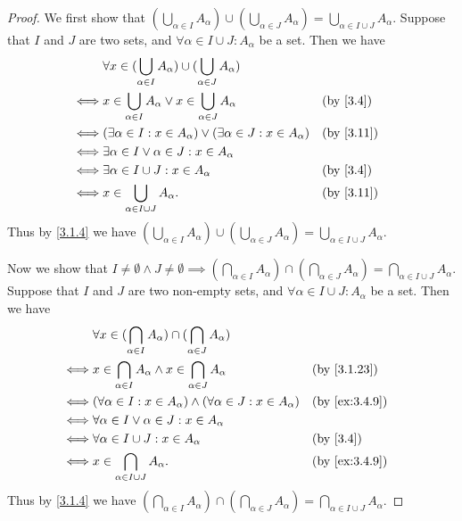 \begin{proof}
  We first show that \((\bigcup_{\alpha \in I} A_{\alpha}) \cup (\bigcup_{\alpha \in J} A_{\alpha}) = \bigcup_{\alpha \in I \cup J} A_{\alpha}\).
  Suppose that \(I\) and \(J\) are two sets, and \(\forall \alpha \in I \cup J : A_{\alpha}\) be a set.
  Then we have
  \begin{align*}
         & \forall x \in (\bigcup_{\alpha \in I} A_{\alpha}) \cup (\bigcup_{\alpha \in J} A_{\alpha})                \\
    \iff & x \in \bigcup_{\alpha \in I} A_{\alpha} \lor x \in \bigcup_{\alpha \in J} A_{\alpha}       &  & \by{3.4}  \\
    \iff & (\exists \alpha \in I : x \in A_{\alpha}) \lor (\exists \alpha \in J : x \in A_{\alpha})   &  & \by{3.11} \\
    \iff & \exists \alpha \in I \lor \alpha \in J : x \in A_{\alpha}                                                 \\
    \iff & \exists \alpha \in I \cup J : x \in A_{\alpha}                                             &  & \by{3.4}  \\
    \iff & x \in \bigcup_{\alpha \in I \cup J} A_{\alpha}.                                            &  & \by{3.11}
  \end{align*}
  Thus by \cref{3.1.4} we have \((\bigcup_{\alpha \in I} A_{\alpha}) \cup (\bigcup_{\alpha \in J} A_{\alpha}) = \bigcup_{\alpha \in I \cup J} A_{\alpha}\).

  Now we show that \(I \neq \emptyset \land J \neq \emptyset \implies (\bigcap_{\alpha \in I} A_{\alpha}) \cap (\bigcap_{\alpha \in J} A_{\alpha}) = \bigcap_{\alpha \in I \cup J} A_{\alpha}\).
  Suppose that \(I\) and \(J\) are two non-empty sets, and \(\forall \alpha \in I \cup J : A_{\alpha}\) be a set.
  Then we have
  \begin{align*}
         & \forall x \in (\bigcap_{\alpha \in I} A_{\alpha}) \cap (\bigcap_{\alpha \in J} A_{\alpha})                    \\
    \iff & x \in \bigcap_{\alpha \in I} A_{\alpha} \land x \in \bigcap_{\alpha \in J} A_{\alpha}      &  & \by{3.1.23}   \\
    \iff & (\forall \alpha \in I : x \in A_{\alpha}) \land (\forall \alpha \in J : x \in A_{\alpha})  &  & \by{ex:3.4.9} \\
    \iff & \forall \alpha \in I \lor \alpha \in J : x \in A_{\alpha}                                                     \\
    \iff & \forall \alpha \in I \cup J : x \in A_{\alpha}                                             &  & \by{3.4}      \\
    \iff & x \in \bigcap_{\alpha \in I \cup J} A_{\alpha}.                                            &  & \by{ex:3.4.9}
  \end{align*}
  Thus by \cref{3.1.4} we have \((\bigcap_{\alpha \in I} A_{\alpha}) \cap (\bigcap_{\alpha \in J} A_{\alpha}) = \bigcap_{\alpha \in I \cup J} A_{\alpha}\).
\end{proof}

